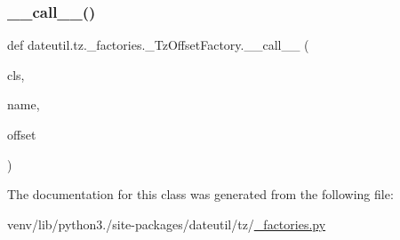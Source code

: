\subsubsection{\texorpdfstring{\+\_\+\+\_\+call\+\_\+\+\_\+()}{\_\_call\_\_()}}
{\footnotesize\ttfamily def dateutil.\+tz.\+\_\+factories.\+\_\+\+Tz\+Offset\+Factory.\+\_\+\+\_\+call\+\_\+\+\_\+ (\begin{DoxyParamCaption}\item[{}]{cls,  }\item[{}]{name,  }\item[{}]{offset }\end{DoxyParamCaption})}



The documentation for this class was generated from the following file\+:\begin{DoxyCompactItemize}
\item 
venv/lib/python3./site-\/packages/dateutil/tz/\hyperlink{__factories_8py}{\+\_\+factories.\+py}\end{DoxyCompactItemize}
